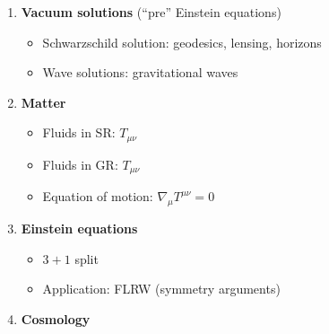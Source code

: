 \begin{enumerate}[leftmargin=*, itemsep=0.6ex]
\begin{itemize}[nosep]
          \end{itemize}
    \item \textbf{Vacuum solutions} (``pre'' Einstein equations)
          \begin{itemize}[nosep]
              \item Schwarzschild solution: geodesics, lensing, horizons
              \item Wave solutions: gravitational waves
          \end{itemize}
    \item \textbf{Matter}
          \begin{itemize}[nosep]
              \item Fluids in SR: $T_{\mu\nu}$
              \item Fluids in GR: $T_{\mu\nu}$
              \item Equation of motion: $\nabla_\mu T^{\mu\nu} = 0$
          \end{itemize}
    \item \textbf{Einstein equations}
          \begin{itemize}[nosep]
              \item $3+1$ split
              \item Application: FLRW (symmetry arguments)
          \end{itemize}
    \item \textbf{Cosmology}
\end{enumerate}

\newpage
